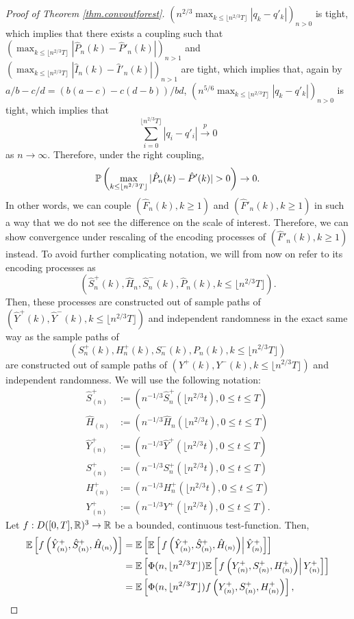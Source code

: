 \begin{proof}[Proof of Theorem \ref{thm.convoutforest}]
$\left(n^{2/3}\max_{k\leq \lfloor n^{2/3}T\rfloor }|q_k-q'_k|\right)_{n>0}$ is tight, which implies that there exists a coupling such that $\left(\max_{k\leq \lfloor n^{2/3}T\rfloor } |\hat{P}_n(k)-\hat{P}'_n(k)|\right)_{n>1}$ and $\left(\max_{k\leq \lfloor n^{2/3}T\rfloor } |\hat{I}_n(k)-\hat{I}'_n(k)|\right)_{n>1}$ are tight, which implies that, again by $a/b-c/d=(b(a-c)-c(d-b))/bd$, 
$\left(n^{5/6}\max_{k\leq \lfloor n^{2/3}T\rfloor }|q_k-q'_k|\right)_{n>0}$ is tight, which implies that 
$$\sum_{i=0}^{\lfloor n^{2/3}T\rfloor }|q_i-q'_i|\overset{p}{\to}0$$
as $n\to \infty$. 
Therefore, under the right coupling, 
$$\P\left(\max_{k\leq \lfloor n^{2/3} T \rfloor}|\hat{P}_n(k)-\hat{P}'(k)|>0\right)\to 0.$$
In other words, we can couple $(\hat{F}_n(k),k\geq 1)$ and $(\hat{F}'_n(k),k\geq 1)$ in such a way that we do not see the difference on the scale of interest. Therefore, we can show convergence under rescaling of the encoding processes of $(\hat{F}'_n(k),k\geq 1)$ instead. To avoid further complicating notation, we will from now on refer to its encoding processes as $$(\hat{S}^{+}_n(k),\hat{H}_n, \hat{S}^-_n(k), \hat{P}_n(k),k\leq \lfloor n^{2/3}T\rfloor).$$ Then, these processes are constructed out of sample paths of $(\hat{Y}^+(k),\hat{Y}^-(k), k\leq \lfloor n^{2/3}T\rfloor )$ and independent randomness in the exact same way as the sample paths of $$({S}_n^{+}(k),{H}_n^+(k),{S}_n^-(k),P_n(k), k \leq \lfloor n^{2/3}T\rfloor )$$ are constructed out of sample paths of $(Y^+(k),Y^-(k), k\leq \lfloor n^{2/3}T\rfloor )$ and independent randomness. 
We will use the following notation:\begin{align*}
    \hat{S}^{+}_{(n)}&:=\left(n^{-1/3}\hat{S}^{+}_n\left(\lfloor n^{2/3} t \right),0\leq t \leq T\right)\\
    \hat{H}_{(n)}&:=\left(n^{-1/3}\hat{H}_n\left(\lfloor n^{2/3} t \right),0\leq t \leq T\right)\\
    \hat{Y}^+_{(n)}&:=\left(n^{-1/3}\hat{Y}^+\left(\lfloor n^{2/3} t \right),0\leq t \leq T\right)\\
     {S}^{+}_{(n)}&:=\left(n^{-1/3}{S}^{+}_n\left(\lfloor n^{2/3} t \right),0\leq t \leq T\right)\\
    {H}^+_{(n)}&:=\left(n^{-1/3}{H}^+_n\left(\lfloor n^{2/3} t \right),0\leq t \leq T\right)\\
    {Y}^+_{(n)}&:=\left(n^{-1/3}{Y}^+\left(\lfloor n^{2/3} t \right),0\leq t \leq T\right).
\end{align*}
Let $f:D([0,T],{\mathbb R})^3\to {\mathbb R}$ be a bounded, continuous test-function. Then,
\begin{align*}{\mathbb E}\left[f\left(\hat{Y}^+_{(n)}, \hat{S}^+_{(n)},  \hat{H}_{(n)}\right) \right]&= {\mathbb E}\left[ {\mathbb E}\left[\left. f\left(\hat{Y}^+_{(n)},\hat{S}^+_{(n)},  \hat{H}_{(n)}\right)\right|\hat{Y}^+_{(n)}\right]\right]\\&={\mathbb E}\left[ \Phi(n,\lfloor n^{2/3} T\rfloor){\mathbb E}\left[\left.f\left(Y^+_{(n)}, S^+_{(n)},  H^+_{(n)}\right)\right| {Y}^+_{(n)}\right]\right]\\&={\mathbb E}\left[ \Phi(n,\lfloor n^{2/3} T\rfloor)f\left(Y^+_{(n)},S^+_{(n)},  H^+_{(n)}\right)\right],\end{align*}

\end{proof}
